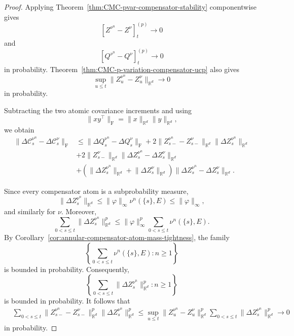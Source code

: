 \documentclass[a4paper,10pt]{article}
\begin{document}
\begin{proof}
Applying Theorem~\ref{thm:CMC-pvar-compensator-stability} componentwise
gives
\[
        [Z^{\nu^n}-Z^\nu]^{(p)}_t
        \longrightarrow0
\]
and
\[
        [Q^{\nu^n}-Q^\nu]^{(p)}_t
        \longrightarrow0
\]
in probability. Theorem~\ref{thm:CMC-p-variation-compensator-ucp}
also gives
\[
        \sup_{u\le t}
        \lVert Z_u^{\nu^n}-Z_u^\nu\rVert_{\mathbb R^d}
        \longrightarrow0
\]
in probability.

Subtracting the two atomic covariance increments and using
\[
        \lVert xy^\top\rVert_{\mathrm F}
        =
        \lVert x\rVert_{\mathbb R^d}
        \lVert y\rVert_{\mathbb R^d},
\]
we obtain
\[
\begin{aligned}
\lVert
\Delta\mathcal C_s^{\nu^n}
-
\Delta\mathcal C_s^\nu
\rVert_{\mathrm F}
&\le
\lVert
\Delta Q_s^{\nu^n}-\Delta Q_s^\nu
\rVert_{\mathrm F}
+
2
\lVert
Z_{s-}^{\nu^n}-Z_{s-}^\nu
\rVert_{\mathbb R^d}
\lVert\Delta Z_s^{\nu^n}\rVert_{\mathbb R^d}
\\
&+
2
\lVert Z_{s-}^\nu\rVert_{\mathbb R^d}
\lVert
\Delta Z_s^{\nu^n}-\Delta Z_s^\nu
\rVert_{\mathbb R^d}
\\
&+
\left(
\lVert\Delta Z_s^{\nu^n}\rVert_{\mathbb R^d}
+
\lVert\Delta Z_s^\nu\rVert_{\mathbb R^d}
\right)
\lVert
\Delta Z_s^{\nu^n}-\Delta Z_s^\nu
\rVert_{\mathbb R^d}.
\end{aligned}
\]

Since every compensator atom is a subprobability measure,
\[
        \lVert\Delta Z_s^{\nu^n}\rVert_{\mathbb R^d}
        \le
        \lVert\varphi\rVert_\infty
        \nu^n(\{s\},E)
        \le
        \lVert\varphi\rVert_\infty,
\]
and similarly for \(\nu\). Moreover,
\[
\sum_{0<s\le t}
\lVert\Delta Z_s^{\nu^n}\rVert_{\mathbb R^d}^p
\le
\lVert\varphi\rVert_\infty^p
\sum_{0<s\le t}\nu^n(\{s\},E).
\]
By
Corollary~\ref{cor:annular-compensator-atom-mass-tightness},
the family
\[
\left\{
        \sum_{0<s\le t}\nu^n(\{s\},E)
        :
        n\ge1
\right\}
\]
is bounded in probability. Consequently,
\[
\left\{
        \sum_{0<s\le t}
        \lVert\Delta Z_s^{\nu^n}\rVert_{\mathbb R^d}^p
        :
        n\ge1
\right\}
\]
is bounded in probability.
It follows that
\[
\begin{aligned}
&\sum_{0<s\le t}
\lVert
Z_{s-}^{\nu^n}-Z_{s-}^\nu
\rVert_{\mathbb R^d}^p
\lVert\Delta Z_s^{\nu^n}\rVert_{\mathbb R^d}^p
\le
\sup_{u\le t}
\lVert Z_u^{\nu^n}-Z_u^\nu\rVert_{\mathbb R^d}^p
\sum_{0<s\le t}
\lVert\Delta Z_s^{\nu^n}\rVert_{\mathbb R^d}^p
\longrightarrow0
\end{aligned}
\]
in probability.


\end{proof}
\end{document}
